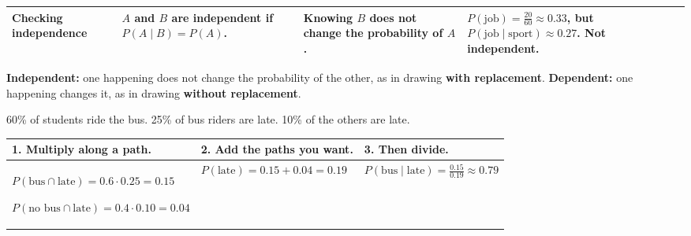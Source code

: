 \documentclass[11pt]{article}
\newcommand{\sumhead}[1]{\par\vspace{0.7em}{\large\bfseries #1}\par\vspace{0.3em}}
\begin{document}
\begin{tabular}{|L{0.95in}|L{2.1in}|L{1.43in}|L{2.05in}|}
Checking independence & $A$ and $B$ are independent if $P(A \mid B) = P(A)$. & Knowing $B$ does not change the probability of $A$. & $P(\text{job}) = \frac{20}{60} \approx 0.33$, but $P(\text{job} \mid \text{sport}) \approx 0.27$. \textbf{Not} independent.\\ \hline
\end{tabular}

\vspace{0.3em}
\textbf{Independent:} one happening does not change the probability of the other, as in drawing \textbf{with replacement}. \textbf{Dependent:} one happening changes it, as in drawing \textbf{without replacement}.

\sumhead{Tree Diagrams}
60\% of students ride the bus. 25\% of bus riders are late. 10\% of the others are late.

\vspace{0.3em}
\begin{tabular}{|L{2.45in}|L{2.15in}|L{1.85in}|}\hline
\textbf{1. Multiply along a path.} & \textbf{2. Add the paths you want.} & \textbf{3. Then divide.}\\ \hline
$P(\text{bus} \cap \text{late}) = 0.6 \cdot 0.25 = 0.15$\par $P(\text{no bus} \cap \text{late}) = 0.4 \cdot 0.10 = 0.04$ & $P(\text{late}) = 0.15 + 0.04 = 0.19$ & $P(\text{bus} \mid \text{late}) = \frac{0.15}{0.19} \approx 0.79$\\ \hline
\end{tabular}
\end{document}
